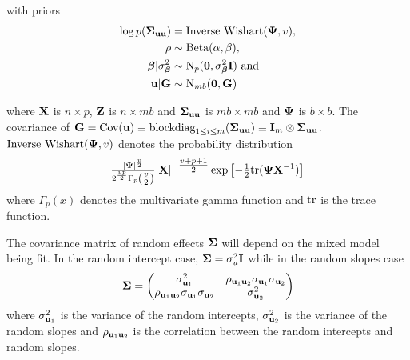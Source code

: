 \noindent with priors
\begin{align*}
	\log{p({\boldsymbol\Sigma}_{{\bf u}{\bf u}})} & = \text{Inverse Wishart}({\boldsymbol \Psi}, v),    \\
	\rho                       & \sim \text{Beta}(\alpha, \beta),             \\
	{\boldsymbol \beta}|\sigma^2_{\boldsymbol \beta}     & \sim \text{N}_p({\bf 0}, \sigma^2_{\boldsymbol \beta} {\bf I}) \text{ and } \\
	{\bf u}|{\bf G}       & \sim \text{N}_{mb}({\bf 0}, {\bf G})              
\end{align*}

\noindent where ${\bf X}$ is $n \times p$, ${\bf Z}$ is $n \times mb$ and ${\boldsymbol \Sigma}_{{\bf u}
{\bf u}}$ is $mb \times mb$ and ${\boldsymbol \Psi}$ is $b \times b$. The covariance of ${\bf G} =
\mbox{Cov}({\bf u}) \equiv \text{blockdiag}_{1 \leq i \leq m} ({\boldsymbol \Sigma}_{{\bf u} {\bf u}}) \equiv {\bf I}_m
\otimes {\boldsymbol\Sigma}_{{\bf u} {\bf u}}$. $\text{Inverse Wishart}({\boldsymbol \Psi}, v)$ denotes the
probability distribution
\begin{equation*}
\tfrac{|{\boldsymbol \Psi}|^\frac{v}{2}}{2^{\frac{vp}{2}}
\Gamma_p{\left(\tfrac{v}{2}\right)}} |{\bf X}|^{-\tfrac{v + p + 1}{2}}
\exp{\left[-\tfrac{1}{2} \text{tr}{({\boldsymbol\Psi}{\bf X}^{-1})}\right]}
\end{equation*}
where $\Gamma_p{(x)}$ denotes the multivariate gamma function and $\text{tr}$ is the
trace function.

The covariance matrix of random effects ${\boldsymbol \Sigma}$ will depend on the mixed
model being fit. In the random intercept case, ${\boldsymbol \Sigma} = \sigma_u^2 {\bf I}$ while
in the random slopes case
\[
	{\boldsymbol \Sigma} = 
	\begin{pmatrix}
		\sigma_{{\bf u}_1}^2                                 & \rho_{{\bf u}_1 {\bf u}_2} \sigma_{{\bf u}_1} \sigma_{{\bf u}_2} \\
		\rho_{{\bf u}_1 {\bf u}_2} \sigma_{{\bf u}_1} \sigma_{{\bf u}_2} & \sigma_{{\bf u}_2}^2                                 
	\end{pmatrix}
\]
where $\sigma_{{\bf u}_1}^2$ is the variance of the random intercepts,
$\sigma_{{\bf u}_2}^2$ is the variance of the random slopes and $\rho_{{\bf u}_1
{\bf u}_2}$ is the correlation between the random intercepts and random slopes.


